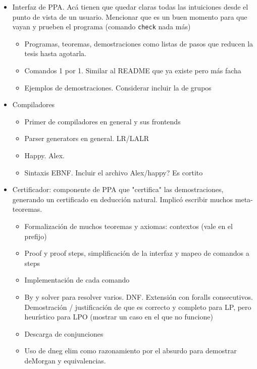 \begin{itemize}
    \item Interfaz de PPA. Acá tienen que quedar claras todas las intuiciones
    desde el punto de vista de un usuario. Mencionar que es un buen momento para
    que vayan y prueben el programa (comando \texttt{check} nada más)
    \begin{itemize}
        \item Programas, teoremas, demostraciones como listas de pasos que
        reducen la tesis hasta agotarla.
        \item Comandos 1 por 1. Similar al README que ya existe pero más facha
        \item Ejemplos de demostraciones. Considerar incluir la de grupos
    \end{itemize}
    \item Compiladores
    \begin{itemize}
        \item Primer de compiladores en general y sus frontends
        \item Parser generators en general. LR/LALR
        \item Happy. Alex.
        \item Sintaxis EBNF. Incluir el archivo Alex/happy? Es cortito
    \end{itemize}
    \item Certificador: componente de PPA que "certifica" las demostraciones,
    generando un certificado en deducción natural. Implicó escribir muchos
    meta-teoremas.
    \begin{itemize}
        \item Formalización de muchos teoremas y axiomas: contextos (vale en el prefijo)
        \item Proof y proof steps, simplificación de la interfaz y mapeo de
        comandos a steps
        \item Implementación de cada comando
        \item By y solver para resolver varios. DNF. Extensión con foralls
        consecutivos. Demostración / justificación de que es correcto y completo
        para LP, pero heurístico para LPO (mostrar un caso en el que no funcione)
        \item Descarga de conjunciones
        \item Uso de dneg elim como razonamiento por el absurdo para demostrar
        deMorgan y equivalencias.
    \end{itemize}
\end{itemize}

